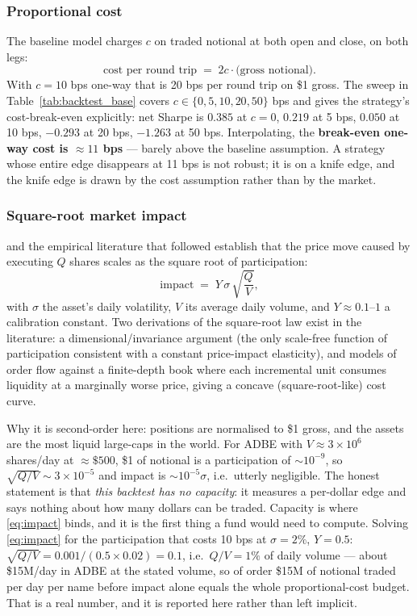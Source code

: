 \subsubsection{Proportional cost}

The baseline model charges $c$ on traded notional at both open and close, on both legs:
\begin{equation}
  \text{cost per round trip} \;=\; 2c\cdot \text{(gross notional)} .
  \label{eq:cost:proportional}
\end{equation}
With $c=10$ bps one-way that is 20 bps per round trip on \$1 gross. The sweep in
Table~\ref{tab:backtest_base} covers $c\in\{0,5,10,20,50\}$ bps and gives the strategy's
cost-break-even explicitly: net Sharpe is $0.385$ at $c=0$, $0.219$ at 5 bps, $0.050$ at
10 bps, $-0.293$ at 20 bps, $-1.263$ at 50 bps. Interpolating, the \textbf{break-even
one-way cost is $\approx11$ bps} --- barely above the baseline assumption. A strategy
whose entire edge disappears at 11 bps is not robust; it is on a knife edge, and the
knife edge is drawn by the cost assumption rather than by the market.

\subsubsection{Square-root market impact}

\cite{almgren2005} and the empirical literature that followed establish that the price
move caused by executing $Q$ shares scales as the square root of participation:
\begin{equation}
  \text{impact} \;=\; Y\,\sigma\,\sqrt{\frac{Q}{V}},
  \label{eq:impact}
\end{equation}
with $\sigma$ the asset's daily volatility, $V$ its average daily volume, and $Y\approx
0.1$--$1$ a calibration constant. Two derivations of the square-root law exist in the
literature: a dimensional/invariance argument (the only scale-free function of
participation consistent with a constant price-impact elasticity), and models of order
flow against a finite-depth book where each incremental unit consumes liquidity at a
marginally worse price, giving a concave (square-root-like) cost curve.

Why it is second-order here: positions are normalised to \$1 gross, and the assets are
the most liquid large-caps in the world. For ADBE with $V\approx3\times10^6$ shares/day at
$\approx\$500$, \$1 of notional is a participation of $\sim10^{-9}$, so
$\sqrt{Q/V}\sim3\times10^{-5}$ and impact is $\sim10^{-5}\sigma$, i.e.\ utterly
negligible. The honest statement is that \emph{this backtest has no capacity}: it measures
a per-dollar edge and says nothing about how many dollars can be traded. Capacity is
where \eqref{eq:impact} binds, and it is the first thing a fund would need to compute.
Solving \eqref{eq:impact} for the participation that costs 10 bps at $\sigma=2\%$,
$Y=0.5$: $\sqrt{Q/V}=0.001/(0.5\times0.02)=0.1$, i.e.\ $Q/V=1\%$ of daily volume --- about
\$15M/day in ADBE at the stated volume, so of order \$15M of notional traded per day per
name before impact alone equals the whole proportional-cost budget. That is a real number,
and it is reported here rather than left implicit.

